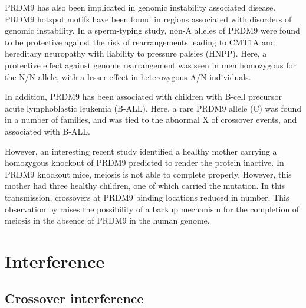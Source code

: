 PRDM9 has also been implicated in genomic instability associated disease.
PRDM9 hotspot motifs have been found in regions associated with disorders of genomic instability\cite{Myers2008}.
In a sperm-typing study, non-A alleles of PRDM9 were found to be protective against the risk of rearrangements leading to CMT1A and hereditary neuropathy with liability to pressure palsies (HNPP)\cite{Berg2010}.
Here, a protective effect against genome rearrangement was seen in men homozygous for the N/N allele, with a lesser effect in heterozygous A/N individuals.

In addition, PRDM9 has been associated with children with B-cell precursor acute lymphoblastic leukemia (B-ALL)\cite{Hussin2013}.
Here, a rare PRDM9 allele (C) was found in a number of families, and was tied to the abnormal X of crossover events, and associated with B-ALL.


However, an interesting recent study identified a healthy mother carrying a homozygous knockout of PRDM9 predicted to render the protein inactive\cite{Narasimhan2016}.
In PRDM9 knockout mice, meiosis is not able to complete properly\cite{Brick2012}.
However, this mother had three healthy children, one of which carried the mutation.
In this transmission, crossovers at PRDM9 binding locations reduced in number.
This observation by \citet{Narasimhan2016} raises the possibility of a backup mechanism for the completion of meiosis in the absence of PRDM9 in the human genome.

\section{Interference}

\subsection{Crossover interference}

